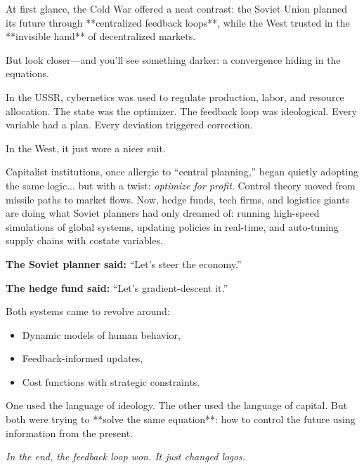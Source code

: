 \begin{tcolorbox}[title=Sidebar: Central Planning vs. Capitalist Optimization — A False Binary?, colback=gray!10, colframe=black, fonttitle=\bfseries]

  At first glance, the Cold War offered a neat contrast: the Soviet Union planned its future through **centralized feedback loops**, while the West trusted in the **invisible hand** of decentralized markets.

  \medskip
  
  But look closer—and you’ll see something darker: a convergence hiding in the equations.

  \medskip
  
  In the USSR, cybernetics was used to regulate production, labor, and resource allocation. The state was the optimizer. The feedback loop was ideological. Every variable had a plan. Every deviation triggered correction.

  \medskip
  
  In the West, it just wore a nicer suit.

  \medskip
  
  Capitalist institutions, once allergic to “central planning,” began quietly adopting the same logic... but with a twist: \emph{optimize for profit}. Control theory moved from missile paths to market flows. Now, hedge funds, tech firms, and logistics giants are doing what Soviet planners had only dreamed of: running high-speed simulations of global systems, updating policies in real-time, and auto-tuning supply chains with costate variables.

  \medskip
  
  \textbf{The Soviet planner said:} “Let’s steer the economy.”

  \medskip
  
  \textbf{The hedge fund said:} “Let’s gradient-descent it.”

  \medskip
  
  Both systems came to revolve around:

  \medskip

  \begin{itemize}
      \item Dynamic models of human behavior,
      \item Feedback-informed updates,
      \item Cost functions with strategic constraints.
  \end{itemize}

  \medskip
  
  One used the language of ideology. The other used the language of capital.  But both were trying to **solve the same equation**: how to control the future using information from the present.

  \medskip
  
  \textit{In the end, the feedback loop won. It just changed logos.}
  
\end{tcolorbox}






